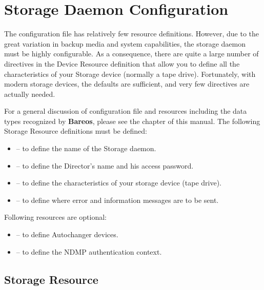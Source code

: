 
\chapter{Storage Daemon Configuration}
\label{StoredConfChapter}

The \bareosSd configuration file has relatively few resource definitions.
However, due to the great variation in backup media and system capabilities,
the storage daemon must be highly configurable. As a consequence, there are
quite a large number of directives in the Device Resource definition that
allow you to define all the characteristics of your Storage device (normally a
tape drive). Fortunately, with modern storage devices, the defaults are
sufficient, and very few directives are actually needed.

For a general discussion of configuration file and resources including the
data types recognized by {\bf Bareos}, please see the
 chapter of this manual. The
following Storage Resource definitions must be defined:

\begin{itemize}
\item
    -- to define the  name of the
   Storage daemon.
\item
    -- to  define the Director's
   name and his access password.
\item
    -- to define  the
   characteristics of your storage device (tape  drive).
\item
    -- to define where error  and
   information messages are to be sent.
\end{itemize}

Following resources are optional:
\begin{itemize}
\item
    -- to define Autochanger devices.
\item
    -- to define the NDMP authentication
   context.
\end{itemize}

\section{Storage Resource}
\label{StorageResource}

